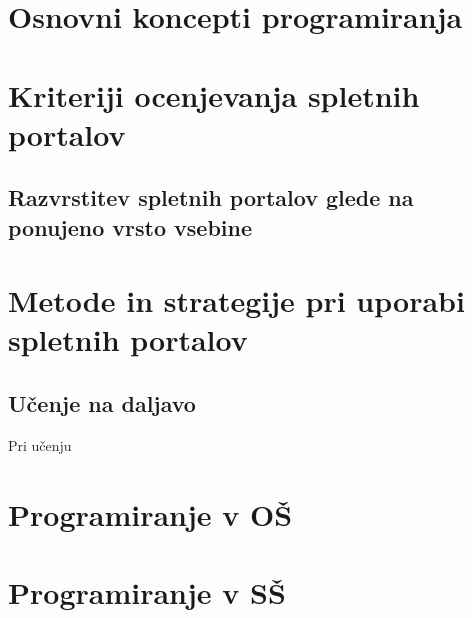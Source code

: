 \section{Osnovni koncepti programiranja}
\label{sec:Osnvni koncepti_programiranja}

\section{Kriteriji ocenjevanja spletnih portalov}
\label{sec:Kriteriji_ocenjevanja}

\subsection{Razvrstitev spletnih portalov glede na ponujeno vrsto
  vsebine}
\label{sec:Razvrstitev_spletnih_portalov}





\section{Metode in strategije pri uporabi spletnih portalov}
\label{sec:Metode_in_strategije_pri_učenju_programiranja}

\subsection{Učenje  na daljavo}
\label{sec:Učenje_na_daljavo}

Pri učenju


\section{Programiranje v OŠ}
\label{sec:Programiranje_v_OŠ}

\section{Programiranje v SŠ}
\label{sec:Programiranje_v_SŠ}




